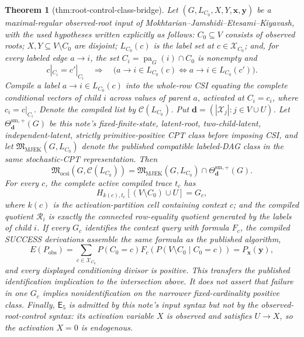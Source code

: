 \documentclass{article}
\newtheorem{theorem}{Theorem}
\begin{document}
\begin{theorem}[thm:root-control-class-bridge]\label{thm:root-control-class-bridge}
Let \((G,L_{C_0},X,Y,\mathbf x,\mathbf y)\) be a maximal-regular observed-root input of Mokhtarian--Jamshidi--Etesami--Kiyavash, with the used hypotheses written explicitly as follows: \(C_0\subseteq V\) consists of observed roots; \(X,Y\subseteq V\setminus C_0\) are disjoint; \(L_{C_0}(c)\) is the label set at \(c\in\mathcal X_{C_0}\); and, for every labeled edge \(a\to i\), the set \(C_i=\operatorname{pa}_G(i)\cap C_0\) is nonempty and
\[
c|_{C_i}=c'|_{C_i}
\quad\Longrightarrow\quad
\bigl(a\to i\in L_{C_0}(c)\Longleftrightarrow a\to i\in L_{C_0}(c')\bigr).
\]
Compile a label \(a\to i\in L_{C_0}(c)\) into the whole-row CSI equating the complete conditional vectors of child \(i\) across values of parent \(a\), activated at \(C_i=c_i\), where \(c_i=c|_{C_i}\). Denote the compiled list by \(\mathcal C(L_{C_0})\). Put \(\mathbf d=(|\mathcal X_j|:j\in V\cup U)\). Let \(\Theta^{\mathrm{sm},+}_{\mathbf d}(G)\) be this note's fixed-finite-state, latent-root, two-child-latent, independent-latent, strictly primitive-positive CPT class before imposing CSI, and let \(\mathfrak M_{\mathrm{MJEK}}(G,L_{C_0})\) denote the published compatible labeled-DAG class in the same stochastic-CPT representation. Then
\[
\mathfrak M_{\mathrm{ocsi}}\!\left(G,\mathcal C(L_{C_0})\right)
=
\mathfrak M_{\mathrm{MJEK}}(G,L_{C_0})
\cap \Theta^{\mathrm{sm},+}_{\mathbf d}(G).
\]
For every \(c\), the complete active compiled trace \(t_c\) has
\[
H_{k(c),t_c}[(V\setminus C_0)\cup U]=G_c,
\]
where \(k(c)\) is the activation-partition cell containing context \(c\); and the compiled quotient \(\mathcal R_i\) is exactly the connected row-equality quotient generated by the labels of child \(i\). If every \(G_c\) identifies the context query with formula \(F_c\), the compiled SUCCESS derivations assemble the same formula as the published algorithm,
\[
E(P_{\mathrm{obs}})
=\sum_{c\in\mathcal X_{C_0}}P(C_0=c)
F_c\!\left(P(V\setminus C_0\mid C_0=c)\right)
=P_{\mathbf x}(\mathbf y),
\]
and every displayed conditioning divisor is positive. This transfers the published identification implication to the intersection above. It does not assert that failure in one \(G_c\) implies nonidentification on the narrower fixed-cardinality positive class. Finally, \(\mathsf E_5\) is admitted by this note's input syntax but not by the observed-root-control syntax: its activation variable \(X\) is observed and satisfies \(U\to X\), so the activation \(X=0\) is endogenous.
\end{theorem}
\end{document}
